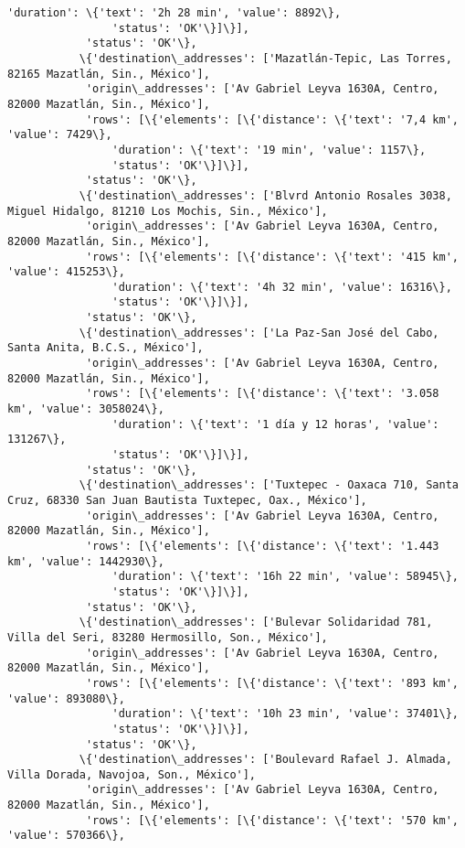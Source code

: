 \documentclass[11pt]{article}
\begin{document}
\begin{Verbatim}[commandchars=\\\{\}]
                'duration': \{'text': '2h 28 min', 'value': 8892\},
                'status': 'OK'\}]\}],
            'status': 'OK'\},
           \{'destination\_addresses': ['Mazatlán-Tepic, Las Torres, 82165 Mazatlán, Sin., México'],
            'origin\_addresses': ['Av Gabriel Leyva 1630A, Centro, 82000 Mazatlán, Sin., México'],
            'rows': [\{'elements': [\{'distance': \{'text': '7,4 km', 'value': 7429\},
                'duration': \{'text': '19 min', 'value': 1157\},
                'status': 'OK'\}]\}],
            'status': 'OK'\},
           \{'destination\_addresses': ['Blvrd Antonio Rosales 3038, Miguel Hidalgo, 81210 Los Mochis, Sin., México'],
            'origin\_addresses': ['Av Gabriel Leyva 1630A, Centro, 82000 Mazatlán, Sin., México'],
            'rows': [\{'elements': [\{'distance': \{'text': '415 km', 'value': 415253\},
                'duration': \{'text': '4h 32 min', 'value': 16316\},
                'status': 'OK'\}]\}],
            'status': 'OK'\},
           \{'destination\_addresses': ['La Paz-San José del Cabo, Santa Anita, B.C.S., México'],
            'origin\_addresses': ['Av Gabriel Leyva 1630A, Centro, 82000 Mazatlán, Sin., México'],
            'rows': [\{'elements': [\{'distance': \{'text': '3.058 km', 'value': 3058024\},
                'duration': \{'text': '1 día y 12 horas', 'value': 131267\},
                'status': 'OK'\}]\}],
            'status': 'OK'\},
           \{'destination\_addresses': ['Tuxtepec - Oaxaca 710, Santa Cruz, 68330 San Juan Bautista Tuxtepec, Oax., México'],
            'origin\_addresses': ['Av Gabriel Leyva 1630A, Centro, 82000 Mazatlán, Sin., México'],
            'rows': [\{'elements': [\{'distance': \{'text': '1.443 km', 'value': 1442930\},
                'duration': \{'text': '16h 22 min', 'value': 58945\},
                'status': 'OK'\}]\}],
            'status': 'OK'\},
           \{'destination\_addresses': ['Bulevar Solidaridad 781, Villa del Seri, 83280 Hermosillo, Son., México'],
            'origin\_addresses': ['Av Gabriel Leyva 1630A, Centro, 82000 Mazatlán, Sin., México'],
            'rows': [\{'elements': [\{'distance': \{'text': '893 km', 'value': 893080\},
                'duration': \{'text': '10h 23 min', 'value': 37401\},
                'status': 'OK'\}]\}],
            'status': 'OK'\},
           \{'destination\_addresses': ['Boulevard Rafael J. Almada, Villa Dorada, Navojoa, Son., México'],
            'origin\_addresses': ['Av Gabriel Leyva 1630A, Centro, 82000 Mazatlán, Sin., México'],
            'rows': [\{'elements': [\{'distance': \{'text': '570 km', 'value': 570366\},

\end{Verbatim}
\end{document}
